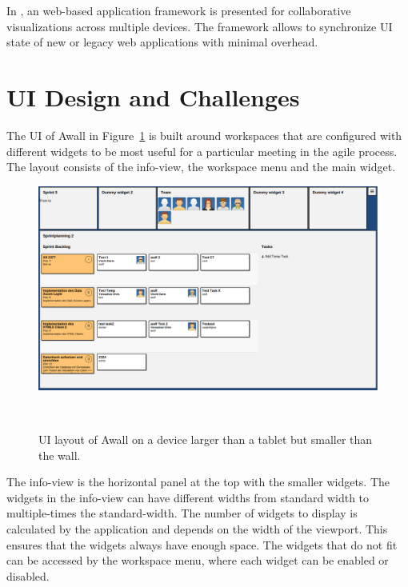 \documentclass{sigchi}
\begin{document}
In \cite{Badam:2014:PCF:2669485.2669518}, an web-based application framework is presented for collaborative visualizations across multiple devices. The framework allows to synchronize UI state of new or legacy web applications with minimal overhead.


\section{UI Design and Challenges}
The UI of Awall in Figure~\ref{fig:awall-layout} is built around workspaces that are configured with different widgets to be most useful for a particular meeting in the agile process.
The layout consists of the info-view, the workspace menu and the main widget.

\begin{figure}
	\centering
	\includegraphics[width=\columnwidth]{figures/awall-layout}
	\caption{UI layout of Awall on a device larger than a tablet but smaller than the wall.}~\label{fig:awall-layout}
\end{figure}

The info-view is the horizontal panel at the top with the smaller widgets.
The widgets in the info-view can have different widths from standard width to multiple-times the standard-width.
The number of widgets to display is calculated by the application and depends on the width of the viewport.
This ensures that the widgets always have enough space.
The widgets that do not fit can be accessed by the workspace menu, where each widget can be enabled or disabled. 
\end{document}
